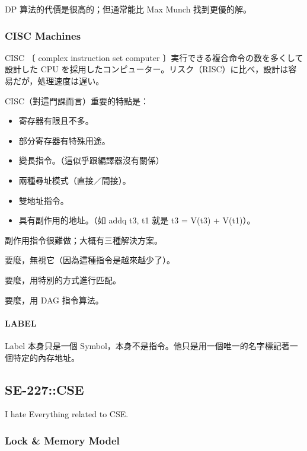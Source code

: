 \documentclass[
]{article}
\begin{document}
DP 算法的代價是很高的；但通常能比 Max Munch 找到更優的解。

\hypertarget{header-n36}{%
\subsubsection{CISC Machines}\label{header-n36}}

CISC 〔 complex instruction set computer
〕実行できる複合命令の数を多くして設計した CPU
を採用したコンピューター。リスク（RISC）に比べ，設計は容易だが，処理速度は遅い。

CISC（對這門課而言）重要的特點是：

\begin{itemize}
\item
  寄存器有限且不多。
\item
  部分寄存器有特殊用途。
\item
  變長指令。（這似乎跟編譯器沒有關係）
\item
  兩種尋址模式（直接／間接）。
\item
  雙地址指令。
\item
  具有副作用的地址。（如 addq t3, t1 就是 t3 = V(t3) + V(t1)）。
\end{itemize}

副作用指令很難做；大概有三種解決方案。

要麼，無視它（因為這種指令是越來越少了）。

要麼，用特別的方式進行匹配。

要麼，用 DAG 指令算法。

\hypertarget{header-n56}{%
\paragraph{LABEL}\label{header-n56}}

Label 本身只是一個
Symbol，本身不是指令。他只是用一個唯一的名字標記著一個特定的內存地址。

\hypertarget{header-n58}{%
\subsection{SE-227::CSE}\label{header-n58}}

I hate Everything related to CSE.

\hypertarget{header-n60}{%
\subsubsection{Lock \& Memory Model}\label{header-n60}}
\end{document}
